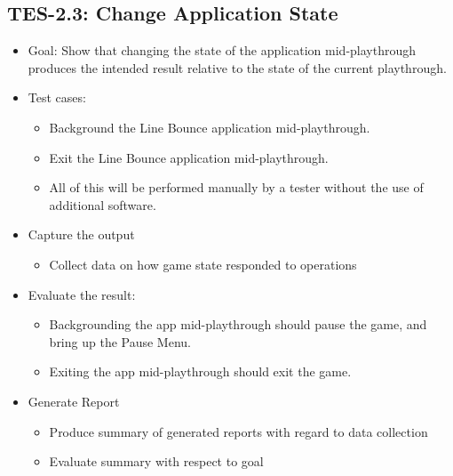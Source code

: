 \subsection{TES-2.3: Change Application State }
\begin{itemize}
\item Goal: Show that changing the state of the application mid-playthrough
produces the intended result relative to the state of the current
playthrough. 
\item Test cases: 

\begin{itemize}
\item Background the Line Bounce application mid-playthrough. 
\item Exit the Line Bounce application mid-playthrough. 
\item All of this will be performed manually by a tester without the use of additional software.
\end{itemize}
\item Capture the output 

\begin{itemize}
\item Collect data on how game state responded to operations 
\end{itemize}
\item Evaluate the result: 

\begin{itemize}
\item Backgrounding the app mid-playthrough should pause the game, and bring
up the Pause Menu. 
\item Exiting the app mid-playthrough should exit the game. 
\end{itemize}
\item Generate Report 

\begin{itemize}
\item Produce summary of generated reports with regard to data collection 
\item Evaluate summary with respect to goal
\end{itemize}
\end{itemize}

